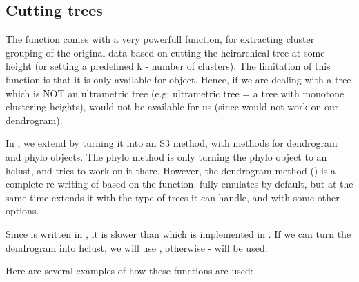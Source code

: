 \documentclass[shortnames,nojss,article]{jss}\usepackage[]{graphicx}\usepackage[]{color}
\newenvironment{knitrout}{}{} %
\begin{document}
\begin{knitrout}
{}



\end{knitrout}





\subsection{Cutting trees}

The  function comes with a very powerfull  function, for extracting cluster grouping of the original data based on cutting the heirarchical tree at some height (or setting a predefined k - number of clusters). The limitation of this function is that it is only available for  object. Hence, if we are dealing with a tree which is NOT an ultrametric tree (e.g: ultrametric tree = a tree with monotone clustering heights),  would not be available for us (since  would not work on our dendrogram).

In , we extend  by turning it into an S3 method, with methods for dendrogram and phylo objects. The phylo method is only turning the phylo object to an hclust, and tries to work on it there. However, the dendrogram method () is a complete re-writing of  based on the  function.  fully emulates  by default, but at the same time extends it with the type of trees it can handle, and with some other options.

Since  is written in , it is slower than  which is implemented in . If we can turn the dendrogram into hclust, we will use , otherwise -  will be used.

Here are several examples of how these functions are used:
\end{document}
